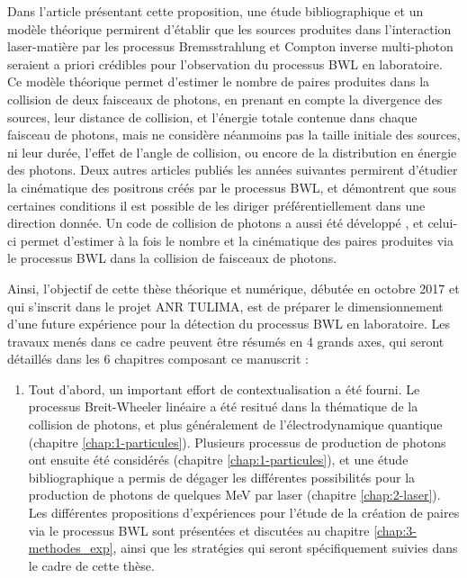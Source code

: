 \begin{refsection}
Dans l'article présentant cette proposition, une étude bibliographique et un modèle théorique permirent d'établir que les sources produites dans l'interaction laser-matière par les processus Bremsstrahlung et Compton inverse multi-photon seraient a priori crédibles pour l'observation du processus BWL en laboratoire. Ce modèle théorique permet d'estimer le nombre de paires produites dans la collision de deux faisceaux de photons, en prenant en compte la divergence des sources, leur distance de collision, et l'énergie totale contenue dans chaque faisceau de photons, mais ne considère néanmoins pas la taille initiale des sources, ni leur durée, l'effet de l'angle de collision, ou encore de la distribution en énergie des photons. Deux autres articles \parencite{ribeyre_2017, ribeyre_2018} publiés les années suivantes permirent d'étudier la cinématique des positrons créés par le processus BWL, et démontrent que sous certaines conditions il est possible de les diriger préférentiellement dans une direction donnée. Un code de collision de photons a aussi été développé \parencite{jansen_2018}, et celui-ci permet d'estimer à la fois le nombre et la cinématique des paires produites via le processus BWL dans la collision de faisceaux de photons.

Ainsi, l'objectif de cette thèse théorique et numérique, débutée en octobre 2017 et qui s'inscrit dans le projet ANR TULIMA, est de préparer le dimensionnement d'une future expérience pour la détection du processus BWL en laboratoire. 
Les travaux menés dans ce cadre peuvent être résumés en 4 grands axes, qui seront détaillés dans les 6 chapitres composant ce manuscrit :
\begin{enumerate}
    \item Tout d'abord, un important effort de contextualisation a été fourni. 
    Le processus Breit-Wheeler linéaire a été resitué dans la thématique de la collision de photons, et plus généralement de l'électrodynamique quantique (chapitre \ref{chap:1-particules}). Plusieurs processus de production de photons ont ensuite été considérés (chapitre \ref{chap:1-particules}), et une étude bibliographique a permis de dégager les différentes possibilités pour la production de photons de quelques MeV par laser (chapitre \ref{chap:2-laser}). Les différentes propositions d'expériences pour l'étude de la création de paires via le processus BWL sont présentées et discutées au chapitre \ref{chap:3-methodes_exp}, ainsi que les stratégies qui seront spécifiquement suivies dans le cadre de cette thèse.
    

\end{enumerate}
\end{refsection}
